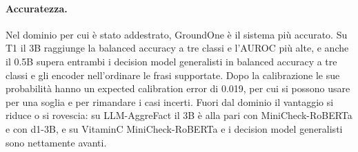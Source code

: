 \paragraph{Accuratezza.} Nel dominio per cui è stato addestrato, GroundOne è il sistema più accurato. Su T1 il 3B
raggiunge la balanced accuracy a tre classi e l'AUROC più alte, e anche il 0.5B supera entrambi i decision model
generalisti in balanced accuracy a tre classi e gli encoder nell'ordinare le frasi supportate. Dopo la calibrazione le sue
probabilità hanno un expected calibration error di 0.019, per cui si possono usare per una soglia e per rimandare i casi
incerti. Fuori dal dominio il vantaggio si riduce o si rovescia: su LLM-AggreFact il 3B è alla pari con
MiniCheck-RoBERTa e con d1-3B, e su VitaminC MiniCheck-RoBERTa e i decision model generalisti sono nettamente avanti.

